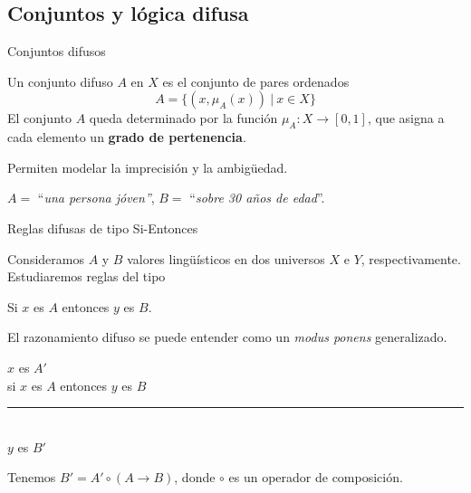 \documentclass[10pt, spanish]{beamer}
\begin{document}
\subsection{Conjuntos y lógica difusa}


\begin{frame}{Conjuntos difusos}
\begin{definition}
	Un conjunto difuso $A$ en $X$ es el conjunto de pares ordenados
\[
A = \{ (x, \mu_A(x)) \ | \ x \in X \}
\]
El conjunto $A$ queda determinado por la función $\mu_A: X \longrightarrow [0,1]$, que asigna a cada elemento un \textbf{grado de pertenencia}.
\end{definition}

\vspace{1em}
Permiten modelar la imprecisión y la ambigüedad.
\begin{example}
	$A =$ ``\textit{una persona jóven''}, $B=$ ``\textit{sobre 30 años de edad}''.
\end{example}
\end{frame}

\begin{frame}{Reglas difusas de tipo Si-Entonces}
  \begin{exampleblock}{\vspace*{-3ex}}

	Consideramos $A$ y $B$ valores lingüísticos en dos universos $X$ e $Y$, respectivamente. Estudiaremos reglas del tipo\\

\begin{center}
	Si $x$ es $A$ entonces $y$ es $B$.
\end{center}
\end{exampleblock}
\pause
\vspace{1em}
El razonamiento difuso se puede entender como un \textit{modus ponens} generalizado.
\vspace{-1em}
  \begin{exampleblock}{\vspace*{-3ex}}
\begin{center}
	$x$ es $A'$\\
    si $x$ es $A$ entonces $y$ es $B$\\
    \rule{5cm}{0.4pt}\\
    $y$ es $B'$
\end{center}

Tenemos $B' = A' \circ (A \to B)$, donde $\circ$ es un operador de composición.
\end{exampleblock}
\end{frame}
\end{document}
